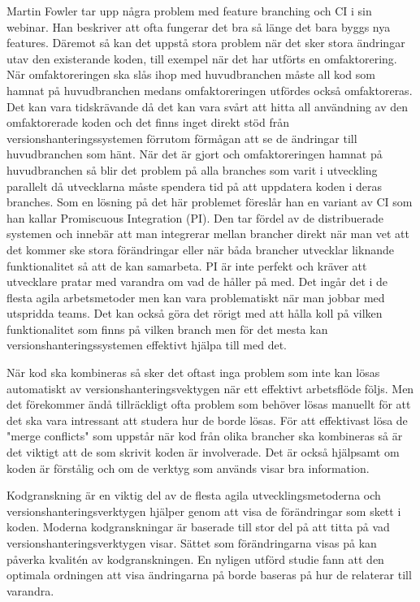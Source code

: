 Martin Fowler tar upp några problem med feature branching och CI i sin webinar. Han beskriver att ofta fungerar det bra så länge det bara byggs nya features. Däremot så kan det uppstå stora problem när det sker stora ändringar utav den existerande koden, till exempel när det har utförts en omfaktorering. När omfaktoreringen ska slås ihop med huvudbranchen måste all kod som hamnat på huvudbranchen medans omfaktoreringen utfördes också omfaktoreras. Det kan vara tidskrävande då det kan vara svårt att hitta all användning av den omfaktorerade koden och det finns inget direkt stöd från versionshanteringssystemen förrutom förmågan att se de ändringar till huvudbranchen som hänt. När det är gjort och omfaktoreringen hamnat på huvudbranchen så blir det problem på alla branches som varit i utveckling parallelt då utvecklarna måste spendera tid på att uppdatera koden i deras branches.
Som en lösning på det här problemet föreslår han en variant av CI som han kallar Promiscuous Integration (PI). Den tar fördel av de distribuerade systemen och innebär att man integrerar mellan brancher direkt när man vet att det kommer ske stora förändringar eller när båda brancher utvecklar liknande funktionalitet så att de kan samarbeta. PI är inte perfekt och kräver att utvecklare pratar med varandra om vad de håller på med. Det ingår det i de flesta agila arbetsmetoder men kan vara problematiskt när man jobbar med utspridda teams. Det kan också göra det rörigt med att hålla koll på vilken funktionalitet som finns på vilken branch men för det mesta kan versionshanteringssystemen effektivt hjälpa till med det.\cite{fowler-feature-branch}



När kod ska kombineras så sker det oftast inga problem som inte kan lösas automatiskt av versionshanteringsvektygen när ett effektivt arbetsflöde följs. Men det förekommer ändå tillräckligt ofta problem som behöver lösas manuellt för att det ska vara intressant att studera hur de borde lösas. För att effektivast lösa de "merge conflicts" som uppstår när kod från olika brancher ska kombineras så är det viktigt att de som skrivit koden är involverade. Det är också hjälpsamt om koden är förstålig och om de verktyg som används visar bra information.\cite{8094445}

Kodgranskning är en viktig del av de flesta agila utvecklingsmetoderna och versionshanteringsverktygen hjälper genom att visa de förändringar som skett i koden. Moderna kodgranskningar är baserade till stor del på att titta på vad versionshanteringsverktygen visar. Sättet som förändringarna visas på kan påverka kvalitén av kodgranskningen. En nyligen utförd studie fann att den optimala ordningen att visa ändringarna på borde baseras på hur de relaterar till varandra. \cite{8094433}